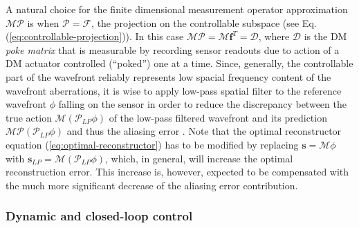 A natural choice for the finite dimensional measurement operator approximation
$\mathcal{MP}$ is when $\mathcal{P} = \mathcal{F}$, the projection on the
controllable subspace (see Eq. (\ref{eq:controllable-projection})). In this
case $\mathcal{MP} = \mathcal{M}\bm{f}^{T} = \mathcal{D}$, where $\mathcal{D}$
is the DM \emph{poke matrix}  that is measurable by
recording sensor readouts
due to action of a DM actuator controlled (``poked'') one at a time. Since,
generally, the controllable part of the wavefront reliably represents low
spacial frequency content of the wavefront aberrations, it is wise to apply
low-pass spatial filter to the reference wavefront $\phi$ falling on the
sensor in order to reduce the discrepancy between the true action
$\mathcal{M} (\mathcal{P}_{LP} \phi)$ of the low-pass filtered wavefront and
its prediction $\mathcal{MP} (\mathcal{P}_{LP} \phi)$ and thus the aliasing
error \cite{Poyneer1}. Note that the optimal reconstructor equation
(\ref{eq:optimal-reconstructor}) has to be modified by replacing $\bm{s} =
\mathcal{M} \phi$ with $\bm{s}_{LP} = \mathcal{M} ( \mathcal{P}_{LP} \phi )$,
which, in general, will increase the optimal reconstruction error. This
increase is, however, expected to be compensated with the much more
significant decrease of the aliasing error contribution.

\subsubsection{Dynamic and closed-loop control}

